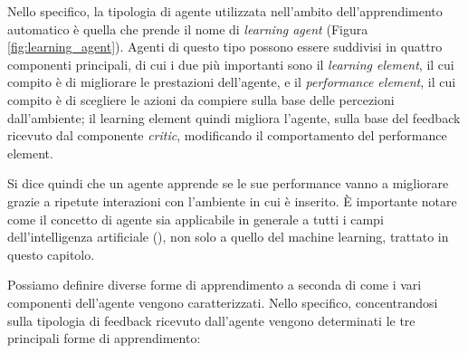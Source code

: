 \documentclass[../../main.tex]{subfiles}
\begin{document}
    Nello specifico, la tipologia di agente utilizzata nell'ambito dell'apprendimento automatico è quella che prende il nome di \textit{learning agent} (Figura \ref{fig:learning_agent}). Agenti di questo tipo possono essere suddivisi in quattro componenti principali, di cui i due più importanti sono il \textit{learning element}, il cui compito è di migliorare le prestazioni dell'agente, e il \textit{performance element}, il cui compito è di scegliere le azioni da compiere sulla base delle percezioni dall'ambiente; il learning element quindi migliora l'agente, sulla base del feedback ricevuto dal componente \textit{critic}, modificando il comportamento del performance element.

    Si dice quindi che un agente apprende se le sue performance vanno a migliorare grazie a ripetute interazioni con l'ambiente in cui è inserito.
    È importante notare come il concetto di agente sia applicabile in generale a tutti i campi dell'intelligenza artificiale (\cite{russel2010}), non solo a quello del machine learning, trattato in questo capitolo.

    Possiamo definire diverse forme di apprendimento a seconda di come i vari componenti dell'agente vengono caratterizzati. Nello specifico, concentrandosi sulla tipologia di feedback ricevuto dall'agente vengono determinati le tre principali forme di apprendimento:
    
\end{document}

